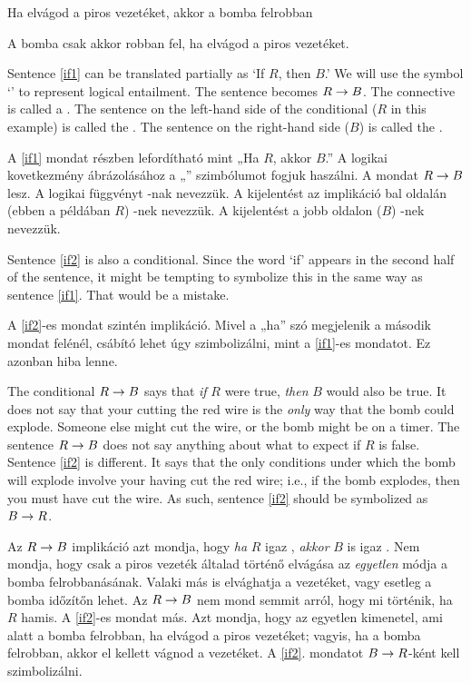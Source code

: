 \begin{earg}
\item[\ex{if1}] Ha elvágod a piros vezetéket, akkor a bomba felrobban
\item[\ex{if2}] A bomba csak akkor robban fel, ha elvágod a piros vezetéket.
\end{earg}

Sentence \ref{if1} can be translated partially as `If $R$, then $B$.' We will use the symbol `\eif' to represent logical {entailment}. The sentence becomes $R\rightarrow B$. The connective is called a . The sentence on the left-hand side of the conditional ($R$ in this example) is called the . The sentence on the right-hand side ($B$) is called the .

A \ref{if1} mondat részben lefordítható mint „Ha $R$, akkor $B$.” A logikai kovetkezmény ábrázolásához a „\eif” szimbólumot fogjuk haszálni.
A mondat $R\rightarrow B$ lesz. A  logikai függvényt -nak nevezzük. A kijelentést az implikáció bal oldalán (ebben a példában $R$) -nek
nevezzük.  A kijelentést a jobb oldalon ($B$) -nek nevezzük.


Sentence \ref{if2} is also a conditional. Since the word `if' appears in the second half of the sentence, it might be tempting to symbolize this in the same way as sentence \ref{if1}. That would be a mistake.

A \ref{if2}-es mondat szintén implikáció. Mivel a „ha” szó megjelenik a második mondat felénél, csábító lehet úgy szimbolizálni, mint a \ref{if1}-es mondatot. Ez azonban hiba lenne.


The conditional $R\rightarrow B$ says that \emph{if} $R$ were true, \emph{then} $B$ would also be true. It does not say that your cutting the red wire is the \emph{only} way that the bomb could explode. Someone else might cut the wire, or the bomb might be on a timer. The sentence $R\rightarrow B$ does not say anything about 
what to expect if $R$ is false. Sentence \ref{if2} is different. It says that the only conditions under which the bomb will explode involve your having cut the red wire; i.e., if the bomb explodes, then you must have cut the wire. As such, sentence \ref{if2} should be symbolized as $B \rightarrow R$.

Az $R\rightarrow B$ implikáció azt mondja, hogy \emph{ha} $R$ igaz , \emph{akkor} $B$ is igaz . Nem mondja, hogy
csak a piros vezeték általad történő elvágása az \emph{egyetlen} módja a bomba felrobbanásának. Valaki 
más is elvághatja a vezetéket, vagy esetleg a bomba időzítőn lehet. Az $R\rightarrow B$ nem mond
semmit arról, hogy mi történik, ha $R$ hamis. A \ref{if2}-es mondat más. Azt mondja, hogy az egyetlen kimenetel, ami alatt a bomba felrobban, ha elvágod a piros vezetéket; vagyis, ha a bomba felrobban, akkor el kellett vágnod a vezetéket. A \ref{if2}. mondatot 
$B \rightarrow R$-ként kell szimbolizálni.



